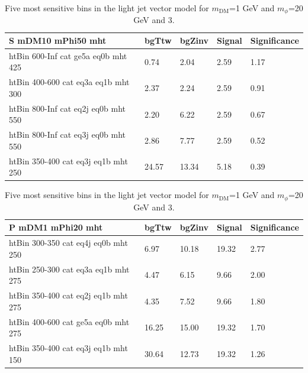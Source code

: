 \begin{table}[h!]
\begin{table}[h!]
  \centering
  \begin{tabular}{lllll}
    \hline
    \textbf{S mDM10 mPhi50 mht} & bgTtw & bgZinv & Signal & Significance \\ \hline
    htBin 600-Inf cat ge5a eq0b mht 425 & 0.74 & 2.04 & 2.59 &1.17 \\
    htBin 400-600 cat eq3a eq1b mht 300 & 2.37 & 2.24 & 2.59 &0.91 \\
    htBin 800-Inf cat eq2j eq0b mht 550 & 2.20 & 6.22 & 2.59 &0.67 \\
    htBin 800-Inf cat eq3j eq0b mht 550 & 2.86 & 7.77 & 2.59 &0.52 \\
    htBin 350-400 cat eq3j eq1b mht 250 & 24.57 & 13.34 & 5.18 &0.39 \\
    \hline
  \end{tabular}
  \caption{Five most sensitive bins in the light jet vector model for $m_\textrm{DM}$=10 GeV and $m_\phi$=50 GeV and 3\fbinv. \label{tab:bestBins_S_3fb}}
\end {table}


\begin{table}[h!]
  \centering
  \begin{tabular}{lllll}
    \hline
    \textbf{P mDM1 mPhi20 mht} & bgTtw & bgZinv & Signal & Significance \\ \hline
    htBin 300-350 cat eq4j eq0b mht 250 & 6.97 & 10.18 & 19.32 &2.77 \\
    htBin 250-300 cat eq3a eq1b mht 275 & 4.47 & 6.15 & 9.66 &2.00 \\
    htBin 350-400 cat eq2j eq1b mht 275 & 4.35 & 7.52 & 9.66 &1.80 \\
    htBin 400-600 cat ge5a eq0b mht 275 & 16.25 & 15.00 & 19.32 &1.70 \\
    htBin 350-400 cat eq3j eq1b mht 150 & 30.64 & 12.73 & 19.32 &1.26 \\
    \hline
  \end{tabular}
  \caption{Five most sensitive bins in the light jet vector model for $m_\textrm{DM}$=1 GeV and $m_\phi$=20 GeV and 3\fbinv. \label{tab:bestBins_P_3fb}}
\end {table}




\end{table}
